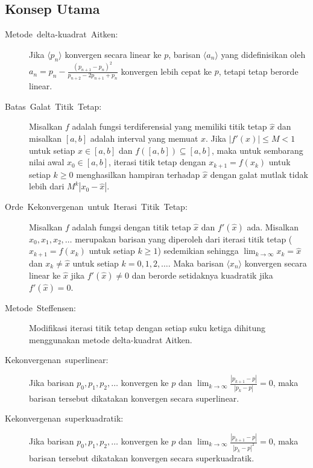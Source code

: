 \subsection{Konsep Utama}
\begin{description}
\item [{Metode~delta-kuadrat~Aitken:}] Jika $\langle p_{n}\rangle$ konvergen
secara linear ke $p$, barisan $\langle a_{n}\rangle$ yang didefinisikan
oleh $a_{n}=p_{n}-\frac{(p_{n+1}-p_{n})^{2}}{p_{n+2}-2p_{n+1}+p_{n}}$
konvergen lebih cepat ke $p$, tetapi tetap berorde linear.
\item [{Batas~Galat~Titik~Tetap:}] 
Misalkan $f$ adalah fungsi terdiferensial yang memiliki titik tetap
$\hat{x}$ dan misalkan $[a,b]$ adalah interval yang memuat $\hat{x}$.
 Jika $|f'(x)|\leq M<1$ untuk setiap $x\in[a,b]$ dan $f([a,b])\subseteq[a,b]$,
maka untuk sembarang nilai awal $x_{0}\in[a,b]$, iterasi titik tetap
dengan $x_{k+1}=f(x_{k})$ untuk setiap $k\geq0$ menghasilkan hampiran
terhadap $\hat{x}$ dengan galat mutlak tidak lebih dari $M^{k}|x_{0}-\hat{x}|$.
\item [{Orde~Kekonvergenan~untuk~Iterasi~Titik~Tetap:}] Misalkan $f$
adalah fungsi dengan titik tetap $\hat{x}$ dan $f'(\hat{x})$ ada.
Misalkan $x_{0},x_{1},x_{2},\ldots$ merupakan barisan yang diperoleh
dari iterasi titik tetap ($x_{k+1}=f(x_{k})$ untuk setiap $k\geq1$)
sedemikian sehingga ${\displaystyle \lim_{k\to\infty}x_{k}=\hat{x}}$
dan $x_{k}\neq\hat{x}$ untuk setiap $k=0,1,2,\ldots$. Maka barisan
$\langle x_{n}\rangle$ konvergen secara linear ke $\hat{x}$ jika
$f'(\hat{x})\neq0$ dan berorde setidaknya kuadratik jika $f'(\hat{x})=0$.
\item [{Metode~Steffensen:}] Modifikasi iterasi
titik tetap dengan setiap suku ketiga dihitung menggunakan metode
delta-kuadrat Aitken.
\item [{Kekonvergenan~superlinear:}] 
Jika barisan $p_{0},p_{1},p_{2},\ldots$ konvergen ke $p$ dan ${\displaystyle \lim_{k\to\infty}\frac{|p_{k+1}-p|}{|p_{k}-p|}=0}$,
maka barisan tersebut dikatakan konvergen secara superlinear.
\item [{Kekonvergenan~superkuadratik:}] 
Jika barisan $p_{0},p_{1},p_{2},\ldots$ konvergen ke $p$ dan ${\displaystyle \lim_{k\to\infty}\frac{|p_{k+1}-p|}{|p_{k}-p|^{2}}=0}$,
maka barisan tersebut dikatakan konvergen secara superkuadratik.
\end{description}

